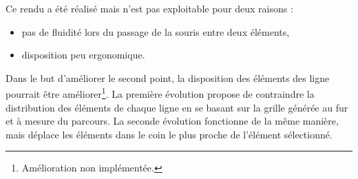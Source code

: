 Ce rendu a été réalisé mais n'est pas exploitable pour deux raisons :

\begin{itemize}
  \item pas de fluidité lors du passage de la souris entre deux éléments,
  \item disposition peu ergonomique.
\end{itemize}

Dans le but d'améliorer le second point, la disposition des éléments des ligne pourrait être améliorer\footnote{Amélioration non implémentée.}. La première évolution propose de contraindre la distribution des éléments de chaque ligne en se basant sur la grille générée au fur et à mesure du parcours. La seconde évolution fonctionne de la même manière, mais déplace les éléments dans le coin le plus proche de l'élément sélectionné.


